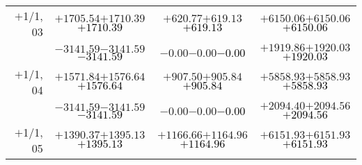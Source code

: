 \documentclass[compress]{beamer}
\begin{document}
\begin{frame}
{\begin{tabular}{r | c | c | c}
$+$1/1, 03 & $+1705.54$\hspace{0.1 cm}$+1710.39$\hspace{0.1 cm}\textcolor{black}{$+1710.39$} & $+620.77$\hspace{0.1 cm}$+619.13$\hspace{0.1 cm}\textcolor{black}{$+619.13$} & $+6150.06$\hspace{0.1 cm}$+6150.06$\hspace{0.1 cm}\textcolor{black}{$+6150.06$} \\
           & $-3141.59$\hspace{0.1 cm}$-3141.59$\hspace{0.1 cm}\textcolor{black}{$-3141.59$} & $-0.00$\hspace{0.1 cm}$-0.00$\hspace{0.1 cm}\textcolor{black}{$-0.00$} & $+1919.86$\hspace{0.1 cm}$+1920.03$\hspace{0.1 cm}\textcolor{black}{$+1920.03$} \\
$+$1/1, 04 & $+1571.84$\hspace{0.1 cm}$+1576.64$\hspace{0.1 cm}\textcolor{black}{$+1576.64$} & $+907.50$\hspace{0.1 cm}$+905.84$\hspace{0.1 cm}\textcolor{black}{$+905.84$} & $+5858.93$\hspace{0.1 cm}$+5858.93$\hspace{0.1 cm}\textcolor{black}{$+5858.93$} \\
           & $-3141.59$\hspace{0.1 cm}$-3141.59$\hspace{0.1 cm}\textcolor{black}{$-3141.59$} & $-0.00$\hspace{0.1 cm}$-0.00$\hspace{0.1 cm}\textcolor{black}{$-0.00$} & $+2094.40$\hspace{0.1 cm}$+2094.56$\hspace{0.1 cm}\textcolor{black}{$+2094.56$} \\
$+$1/1, 05 & $+1390.37$\hspace{0.1 cm}$+1395.13$\hspace{0.1 cm}\textcolor{black}{$+1395.13$} & $+1166.66$\hspace{0.1 cm}$+1164.96$\hspace{0.1 cm}\textcolor{black}{$+1164.96$} & $+6151.93$\hspace{0.1 cm}$+6151.93$\hspace{0.1 cm}\textcolor{black}{$+6151.93$} \\

\end{tabular}}
\end{frame}
\end{document}
